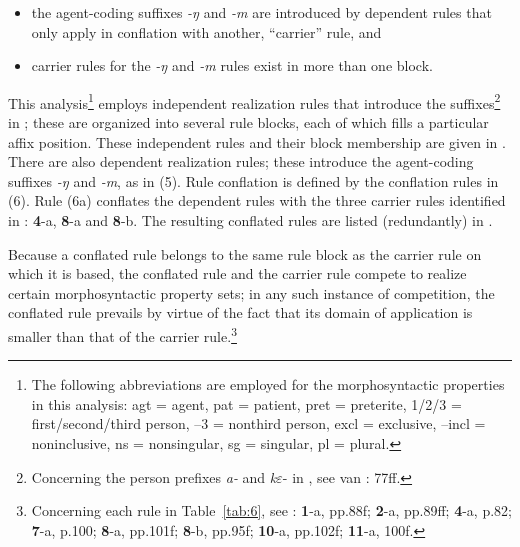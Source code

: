 \documentclass[output=paper,
modfonts
]{LSP/langsci}
\begin{document}
\begin{itemize}
\item 
the agent\nobreakdash-coding suffixes \textit{\nobreakdash-ŋ} and \textit{\nobreakdash-m} are introduced by dependent rules that only apply in conflation with another, “carrier” rule, and
\item 
carrier rules for the \textit{\nobreakdash-ŋ} and \textit{\nobreakdash-m} rules exist in more than one block.  
\end{itemize}

This analysis\footnote{The following abbreviations are employed for the morphosyntactic properties in this analysis:  agt = agent, pat = patient, pret = preterite, 1/2/3 = first/second/third person, –3 = nonthird person, excl = exclusive, –incl = noninclusive, ns = nonsingular, sg = singular, pl = plural.} employs independent realization rules that introduce the suffixes\footnote{Concerning the person prefixes \textit{a\nobreakdash-} and \textit{k$\varepsilon $}\nobreakdash- in , see van \citealt{Driem1987}: 77ff.} in ; these are organized into several rule blocks, each of which fills a particular affix position.  These independent rules and their block membership are given in .  There are also dependent realization rules; these introduce the agent\nobreakdash-coding suffixes \textit{\nobreakdash-ŋ} and \textit{\nobreakdash-m}, as in (5).  Rule conflation is defined by the conflation rules in (6).  Rule (6a) conflates the dependent rules with the three carrier rules identified in :  \textbf{4}\nobreakdash-a, \textbf{8}\nobreakdash-a and \textbf{8}\nobreakdash-b.  The resulting conflated rules are listed (redundantly) in .  

Because a conflated rule belongs to the same rule block as the carrier rule on which it is based, the conflated rule and the carrier rule compete to realize certain morphosyntactic property sets; in any such instance of competition, the conflated rule prevails by virtue of the fact that its domain of application is smaller than that of the carrier rule.\footnote{Concerning each rule in Table~\ref{tab:6}, see \citet{Driem1987}: \textbf{1}\nobreakdash-a, pp.88f; \textbf{2}\nobreakdash-a, 
pp.89ff; \textbf{4}\nobreakdash-a, p.82; \textbf{7}\nobreakdash-a, p.100; \textbf{8}\nobreakdash-a, pp.101f; \textbf{8}\nobreakdash-b, pp.95f; \textbf{10}\nobreakdash-a, 
pp.102f; \textbf{11}\nobreakdash-a, 100f.}
\end{document}
